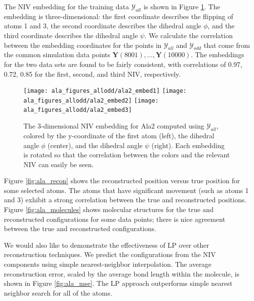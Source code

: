 \documentclass[aip,jcp,preprint]{revtex4-1}
\begin{document}
The NIV embedding for the training data $\mathcal{Y}_{all}$ is shown in Figure \ref{fig:ala_embed}.
%
The embedding is three-dimensional: the first coordinate describes the flipping of atoms 1 and 3, the second coordinate describes the dihedral angle $\phi$, and the third coordinate describes the dihedral angle $\psi$.
%
We calculate the correlation between the embedding coordinates for the points in $\mathcal{Y}_{all}$ and $\mathcal{Y}_{odd}$
that come from the common simulation data points $\mathbf{Y}(8001), \dots, \mathbf{Y}(10000)$.
%
The embeddings for the two data sets are found to be fairly consistent, with correlations of 0.97, 0.72, 0.85 for the first, second, and third NIV, respectively.


\begin{figure}[ht]
    \texttt{[image: ala\_figures\_allodd/ala2\_embed1]}
    \texttt{[image: ala\_figures\_allodd/ala2\_embed2]}
    \texttt{[image: ala\_figures\_allodd/ala2\_embed3]}
    \caption{The 3-dimensional NIV embedding for Ala2 computed using $\mathcal{Y}_{all}$, colored by the y-coordinate of the first atom (left), the dihedral angle $\phi$ (center), and the dihedral angle $\psi$ (right). Each embedding is rotated so that the correlation between the colors and the relevant NIV can easily be seen.}
    \label{fig:ala_embed}
\end{figure}


Figure \ref{fig:ala_recon} shows the reconstructed position versus true position for some selected atoms.
%
The atoms that have significant movement (such as atoms 1 and 3) exhibit a strong correlation between the true and reconstructed positions.
%
Figure \ref{fig:ala_molecules} shows molecular structures for the true and reconstructed configurations for some data points;
there is nice agreement between the true and reconstructed configurations.

We would also like to demonstrate the effectiveness of LP over other reconstruction techniques.
%
We predict the configurations from the NIV components using simple nearest-neighbor interpolation.
%
The average reconstruction error, scaled by the average bond length within the molecule, is shown in Figure \ref{fig:ala_mse}.
%
The LP approach outperforms simple nearest neighbor search for all of the atoms.
\end{document}
